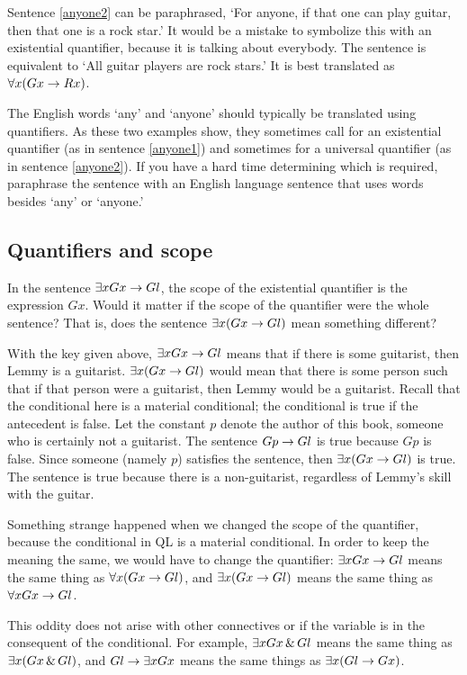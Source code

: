 Sentence \ref{anyone2} can be paraphrased, `For anyone, if that one can play guitar, then that one is a rock star.' It would be a mistake to symbolize this with an existential quantifier, because it is talking about everybody. The sentence is equivalent to `All guitar players are rock stars.' It is best translated as $\forall x(Gx \rightarrow Rx)$.

The English words `any' and `anyone' should typically be translated using quantifiers. As these two examples show, they sometimes call for an existential quantifier (as in sentence \ref{anyone1}) and sometimes for a universal quantifier (as in sentence \ref{anyone2}). If you have a hard time determining which is required, paraphrase the sentence with an English language sentence that uses words besides `any' or `anyone.'


\subsection{Quantifiers and scope}

In the sentence $\exists x Gx \rightarrow Gl$, the scope of the existential quantifier is the expression $Gx$. Would it matter if the scope of the quantifier were the whole sentence? That is, does the sentence $\exists x (Gx \rightarrow Gl)$ mean something different?

With the key given above, $\exists x Gx \rightarrow Gl$ means that if there is some guitarist, then Lemmy is a guitarist. $\exists x (Gx \rightarrow Gl)$ would mean that there is some person such that if that person were a guitarist, then Lemmy would be a guitarist. Recall that the conditional here is a material conditional; the conditional is true if the antecedent is false. Let the constant $p$ denote the author of this book, someone who is certainly not a guitarist. The sentence $Gp \rightarrow Gl$ is true because $Gp$ is false. Since someone (namely $p$) satisfies the sentence, then $\exists x (Gx \rightarrow Gl)$ is true. The sentence is true because there is a non-guitarist, regardless of Lemmy's skill with the guitar.


Something strange happened when we changed the scope of the quantifier, because the conditional in QL is a material conditional. In order to keep the meaning the same, we would have to change the quantifier: $\exists x Gx \rightarrow Gl$ means the same thing as $\forall x (Gx \rightarrow Gl)$, and $\exists x (Gx \rightarrow Gl)$ means the same thing as $\forall x Gx \rightarrow Gl$.

This oddity does not arise with other connectives or if the variable is in the consequent of the conditional. For example, $\exists x Gx \,\&\, Gl$ means the same thing as $\exists x (Gx \,\&\, Gl)$, and $Gl \rightarrow \exists x Gx$ means the same things as $\exists x(Gl \rightarrow Gx)$.


